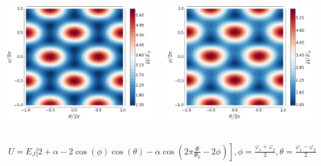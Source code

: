 \documentclass[aspectratio=169, 13pt]{beamer}
\begin{document}
\begin{frame}[c]
{\begin{columns}[t]
\vspace{1cm}
\includegraphics[width=\textwidth]{qubit_potential}


\vspace{1cm}
\includegraphics[width=\textwidth]{qubit_potential2}

\end{columns}

\begin{gather*}
 U = E_J\bigg[2+\alpha - 2\cos(\phi)\cos(\theta) 
-\left. \alpha\cos\left(2\pi\frac{\Phi}{\Phi_0} -2\phi \right)\right], \phi = \frac{\varphi_1+\varphi_2}{2}, \theta=\frac{\varphi_1 - \varphi_2}{2}
\end{gather*}
}

\end{frame}
\end{document}
